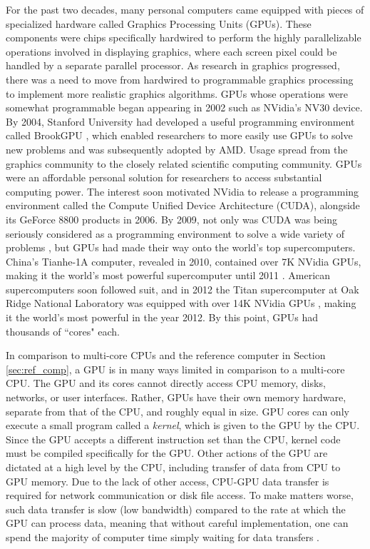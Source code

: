 For the past two decades, many personal computers came
equipped with pieces of specialized hardware called
Graphics Processing Units (GPUs).
These components were chips specifically hardwired to
perform the highly parallelizable operations involved
in displaying graphics, where each screen pixel could be handled
by a separate parallel processor.
As research in graphics progressed, there was a need to
move from hardwired to programmable graphics processing
to implement more realistic graphics algorithms.
GPUs whose operations were somewhat programmable began appearing
in 2002 such as NVidia's NV30 device.
By 2004, Stanford University had developed a useful programming
environment called BrookGPU \cite{buck2004brook}, which
enabled researchers to more easily use GPUs to solve new problems
and was subsequently adopted by AMD.
Usage spread from the graphics community to the closely
related scientific computing community.
GPUs were an affordable personal solution for researchers
to access substantial computing power.
The interest soon motivated NVidia to release a programming
environment called the Compute Unified Device Architecture (CUDA),
alongside its GeForce 8800 products in 2006.
By 2009, not only was CUDA was being seriously considered as a programming
environment to solve a wide variety of problems \cite{hwu2009compute},
but GPUs had made their way onto the world's top supercomputers.
China's Tianhe-1A computer, revealed in 2010,
contained over 7K NVidia GPUs, making it the world's
most powerful supercomputer until 2011 \cite{yang2011tianhe}.
American supercomputers soon followed suit, and in 2012
the Titan supercomputer at Oak Ridge National Laboratory
was equipped with over 14K NVidia GPUs \cite{bland2012titan},
making it the world's most powerful in the year 2012.
By this point, GPUs had thousands of ``cores" each.

In comparison to multi-core CPUs and the reference computer
in Section \ref{sec:ref_comp},
a GPU is in many ways limited in comparison to a multi-core CPU.
The GPU and its cores cannot directly access CPU memory,
disks, networks, or user interfaces.
Rather, GPUs have their own memory hardware, separate from that of the CPU,
and roughly equal in size.
GPU cores can only execute a small program called a \emph{kernel},
which is given to the GPU by the CPU.
Since the GPU accepts a different instruction set than the CPU,
kernel code must be compiled specifically for the GPU.
Other actions of the GPU are dictated at a high level
by the CPU, including transfer of data from CPU to GPU memory.
Due to the lack of other access, CPU-GPU data transfer is required
for network communication or disk file access.
To make matters worse, such data transfer is slow (low bandwidth)
compared to the rate at which the GPU can process data,
meaning that without careful implementation, one can spend
the majority of computer time simply waiting for data transfers
\cite{gregg2011data}.

